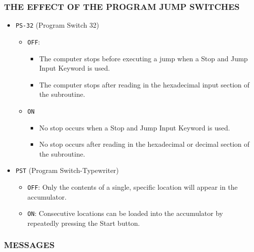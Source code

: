 \subsubsection*{THE EFFECT OF THE PROGRAM JUMP SWITCHES}
\begin{itemize}
\item \texttt{PS-32} (Program Switch 32)
\begin{itemize}
\item \texttt{OFF}: 
\begin{itemize}
    \item The computer stops before executing a jump when a Stop and Jump Input Keyword is used.
    \item The computer stops after reading in the hexadecimal input section of the subroutine.
\end{itemize}
\item \texttt{ON}
\begin{itemize}
    \item No stop occurs when a Stop and Jump Input Keyword is used.
    \item No stop occurs after reading in the hexadecimal or decimal section of the subroutine.
\end{itemize}
\end{itemize}
\item \texttt{PST} (Program Switch-Typewriter)
\begin{itemize}
\item \texttt{OFF}: Only the contents of a single, specific location will appear in the accumulator.
\item \texttt{ON}: Consecutive locations can be loaded into the accumulator by repeatedly pressing the Start button.
\end{itemize}
\end{itemize}

\subsubsection*{MESSAGES}
